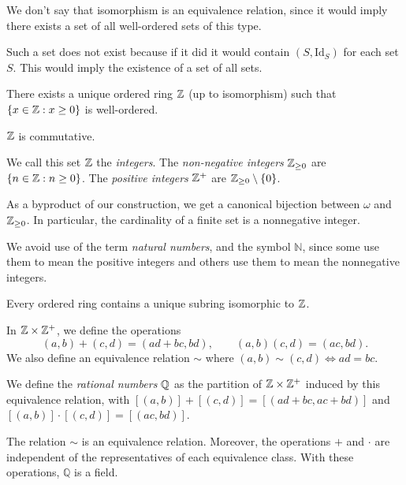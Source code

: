   \begin{rem}
    We don't say that isomorphism is an equivalence relation, since it would
    imply there exists a set of all well-ordered sets of this type.

    Such a set does not exist because if it did it would contain
    $(S,\mathrm{Id}_S)$ for each set $S$. This would imply the existence of a
    set of all sets.
  \end{rem}
  \begin{thm}
    There exists a unique ordered ring $\mathbb{Z}$ (up to isomorphism) such that
    $\{x\in\mathbb{Z}:x\ge 0\}$ is well-ordered.

    $\mathbb{Z}$ is commutative.
  \end{thm}
  \begin{defn}
    We call this set $\mathbb{Z}$ the \emph{integers}. The \emph{non-negative
    integers} $\mathbb{Z}_{\ge 0}$ are $\{n\in\mathbb{Z}: n\ge 0\}$. The \emph{positive
    integers} $\mathbb{Z}^+$ are $\mathbb{Z}_{\ge 0}\setminus \{0\}$.
  \end{defn}
  \begin{rem}
    As a byproduct of our construction, we get a canonical bijection between
    $\omega$ and $\mathbb{Z}_{\ge 0}$.
    In particular, the cardinality of a finite set is a nonnegative integer.
  \end{rem}
  \begin{rem}
    We avoid use of the term \emph{natural numbers}, and the symbol $\mathbb N$,
    since
    some use them to mean the positive integers and others use them to mean the
    nonnegative integers.
  \end{rem}
  \begin{prop}
    Every ordered ring contains a unique subring isomorphic to $\mathbb{Z}$.
  \end{prop}
  \begin{defn}
    In $\mathbb{Z}\times\mathbb{Z}^+$, we define the operations
    \[(a,b)+(c,d)=(ad+bc,bd),\qquad (a,b)(c,d)=(ac,bd).\]
    We also define an equivalence relation $\sim$ where
    $(a,b)\sim (c,d)\iff ad=bc$.

    We define the \emph{rational numbers} $\mathbb{Q}$ as the partition
    of $\mathbb{Z}\times\mathbb{Z}^+$ induced by this equivalence relation, with
    $[(a,b)]+[(c,d)]=[(ad+bc,ac+bd)]$ and $[(a,b)]\cdot [(c,d)]=[(ac,bd)]$.
  \end{defn}
  \begin{prop}
    The relation $\sim$ is an equivalence relation. Moreover, the operations $+$
    and $\cdot$ are independent of the representatives of each equivalence
    class. With these operations, $\mathbb Q$ is a field.
  \end{prop}
